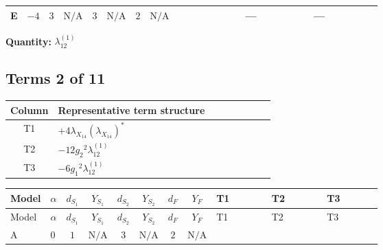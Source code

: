 \documentclass[8pt]{article}
\begin{document}
\begin{landscape}
\begin{longtable}{@{}llcccccc >{\raggedright\arraybackslash}p{0.21\linewidth} >{\raggedright\arraybackslash}p{0.21\linewidth} >{\raggedright\arraybackslash}p{0.21\linewidth}@{}}
\midrule
E & $-4$ & $3$ & $\text{N/A}$ & $3$ & $\text{N/A}$ & $2$ & $\text{N/A}$ & \scriptsize\adjustbox{max width=\linewidth}{$\begin{gathered} 2 {\lambda_5} \left({\lambda_5}\right)^{*}\end{gathered}$} & --- & --- \\
\midrule
\bottomrule
\end{longtable}
\clearpage
\noindent\textbf{Quantity: }$\lambda_{12}^{(1)}$\par\smallskip
\subsection*{Terms 2 of 11}
\begin{center}
\begin{tabular}{@{}c >{\raggedright\arraybackslash}p{0.82\linewidth}@{}}
\toprule
Column & Representative term structure \\
\midrule
T1 & \(\displaystyle +4 {\lambda_{X_{14}}} \left({\lambda_{X_{14}}}\right)^{*}\) \\
\midrule
T2 & \(\displaystyle -12 {g_2}^2 {\lambda_{12}^{(1)}}\) \\
\midrule
T3 & \(\displaystyle -6 {g_1}^2 {\lambda_{12}^{(1)}}\) \\
\midrule
\bottomrule
\end{tabular}
\end{center}
\smallskip
\tiny
\begin{longtable}{@{}llcccccc >{\raggedright\arraybackslash}p{0.21\linewidth} >{\raggedright\arraybackslash}p{0.21\linewidth} >{\raggedright\arraybackslash}p{0.21\linewidth}@{}}
\toprule
Model & $\alpha$ & $d_{S_1}$ & $Y_{S_1}$ & $d_{S_2}$ & $Y_{S_2}$ & $d_F$ & $Y_F$ & T1 & T2 & T3 \\
\midrule
\endfirsthead
\toprule
Model & $\alpha$ & $d_{S_1}$ & $Y_{S_1}$ & $d_{S_2}$ & $Y_{S_2}$ & $d_F$ & $Y_F$ & T1 & T2 & T3 \\
\midrule
\endhead
A & $0$ & $1$ & $\text{N/A}$ & $3$ & $\text{N/A}$ & $2$ & $\text{N/A}$ & \scriptsize\adjustbox{max width=\linewidth}{$\begin{gathered} +4 {\lambda_{X_{14}}} \left({\lambda_{X_{14}}}\right)^{*}\end{gathered}$} & \scriptsize\adjustbox{max width=\linewidth}{$\begin{gathered} -12 {g_2}^2 {\lambda_{12}^{(1)}}\end{gathered}$} & \scriptsize\adjustbox{max width=\linewidth}{$\begin{gathered} -6 {g_1}^2 {\lambda_{12}^{(1)}}\end{gathered}$} \\

\end{longtable}
\end{landscape}
\end{document}
